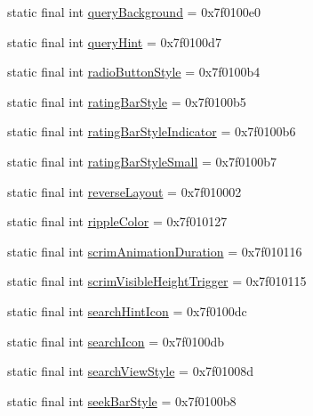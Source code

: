 \begin{CompactItemize}
\item 
static final int \hyperlink{classandroid_1_1support_1_1mediacompat_1_1_r_1_1attr_80db982ae541be8affed07bb982694d0}{queryBackground} = 0x7f0100e0
\item 
static final int \hyperlink{classandroid_1_1support_1_1mediacompat_1_1_r_1_1attr_70d39ad74f326eb709e154ea70cea27a}{queryHint} = 0x7f0100d7
\item 
static final int \hyperlink{classandroid_1_1support_1_1mediacompat_1_1_r_1_1attr_2d6fd2aff9ef92f58d395bc6fa421325}{radioButtonStyle} = 0x7f0100b4
\item 
static final int \hyperlink{classandroid_1_1support_1_1mediacompat_1_1_r_1_1attr_edcaeee8fdb8d383e047039a906e378e}{ratingBarStyle} = 0x7f0100b5
\item 
static final int \hyperlink{classandroid_1_1support_1_1mediacompat_1_1_r_1_1attr_8e950a1e761bc7f19f44c4e43d190485}{ratingBarStyleIndicator} = 0x7f0100b6
\item 
static final int \hyperlink{classandroid_1_1support_1_1mediacompat_1_1_r_1_1attr_bcca7a8d4cab287a232e561afc7fcfa3}{ratingBarStyleSmall} = 0x7f0100b7
\item 
static final int \hyperlink{classandroid_1_1support_1_1mediacompat_1_1_r_1_1attr_388540c29cfe031aa89a2c19d6b08c32}{reverseLayout} = 0x7f010002
\item 
static final int \hyperlink{classandroid_1_1support_1_1mediacompat_1_1_r_1_1attr_627e3324d4eb39e16bd195d0d0fc0e97}{rippleColor} = 0x7f010127
\item 
static final int \hyperlink{classandroid_1_1support_1_1mediacompat_1_1_r_1_1attr_270a859bf2dee23c2db5c9fc20eac24b}{scrimAnimationDuration} = 0x7f010116
\item 
static final int \hyperlink{classandroid_1_1support_1_1mediacompat_1_1_r_1_1attr_7764868c83c35bd5efce3998f4fbaffe}{scrimVisibleHeightTrigger} = 0x7f010115
\item 
static final int \hyperlink{classandroid_1_1support_1_1mediacompat_1_1_r_1_1attr_d100ef1642d1cb17410f7c1b50796afd}{searchHintIcon} = 0x7f0100dc
\item 
static final int \hyperlink{classandroid_1_1support_1_1mediacompat_1_1_r_1_1attr_653b01bbd2aa6f004441a21a541a7d84}{searchIcon} = 0x7f0100db
\item 
static final int \hyperlink{classandroid_1_1support_1_1mediacompat_1_1_r_1_1attr_b1317c389bdaad934e2b6c6bf120956e}{searchViewStyle} = 0x7f01008d
\item 
static final int \hyperlink{classandroid_1_1support_1_1mediacompat_1_1_r_1_1attr_698a4f7798e4ed17b7ac63842aec1001}{seekBarStyle} = 0x7f0100b8

\end{CompactItemize}
